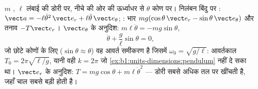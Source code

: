 \begin{example}[सरल लोलक]\label{ex:b1:newton-dynamics:pendulum}
$m$ , $\ell$ लंबाई की डोरी पर, नीचे की ओर की ऊर्ध्वाधर से
$\theta$ कोण पर। निलंबन बिंदु पर : $\vect a =
-\ell\dot\theta^2\,\vect e_r + \ell\ddot\theta\,\vect e_\theta$; : भार
$mg(\cos\theta\,\vect e_r - \sin\theta\,\vect e_\theta)$ और तनाव
$-T\vect e_r$। $\vect e_\theta$ के अनुदिश: $m\ell\ddot\theta =
-mg\sin\theta$,
\[
\ddot\theta + \frac{g}{\ell}\sin\theta = 0 ,
\]
जो छोटे कोणों के लिए ($\sin\theta \approx \theta$) वह आवर्त समीकरण है
जिसमें $\omega_0 = \sqrt{g/\ell}$: आवर्तकाल $T_0 = 2\pi\sqrt{\ell/g}$, यानी
वही $k = 2\pi$ जो \cref{ex:b1:units-dimensions:pendulum} नहीं दे सका था।
$\vect e_r$ के अनुदिश: $T = mg\cos\theta + m\ell\dot\theta^2$ --- डोरी सबसे
अधिक तल पर खींचती है, जहाँ चाल सबसे बड़ी होती है।
\end{example}


